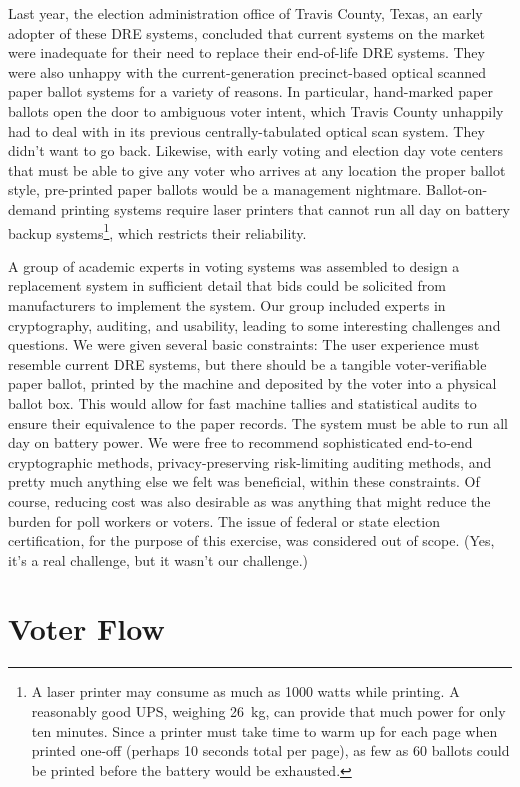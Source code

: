 \documentclass[letterpaper, 10pt, twocolumn]{article}
\begin{document}
Last year, the election administration office of Travis County, Texas, an
early adopter of these DRE systems, concluded that current
systems on the market were inadequate for their need to replace their
end-of-life DRE systems. They were also unhappy with the
current-generation precinct-based optical scanned paper ballot systems
for a variety of reasons. In particular, hand-marked paper ballots
open the door to ambiguous voter intent, which Travis County unhappily
had to deal with in its previous centrally-tabulated optical scan
system. They didn't want to go back. Likewise, with early
voting and election day vote centers that must be able to give
any voter who arrives at
any location the proper ballot style, pre-printed paper ballots would
be a management nightmare.
Ballot-on-demand printing systems
require laser printers that cannot run all day on battery backup
systems\footnote{A laser printer may consume as much as 1000 watts
  while printing. A reasonably good UPS, weighing 26~kg, can provide
  that much power for only ten minutes. Since a printer must take time
  to warm up for each page when printed one-off (perhaps 10
  seconds total per page), as few as 60 ballots could be printed before the
  battery would be exhausted.},
which restricts their reliability.

A group of academic experts in voting systems was assembled 
to design a replacement system in sufficient
detail that bids could be solicited from manufacturers to implement
the system. Our group included experts in cryptography, auditing, and
usability, leading to some interesting challenges and questions. We
were given several basic constraints: The user experience must
resemble current DRE systems, but there should be a tangible
voter-verifiable paper ballot, printed by the machine and deposited by
the voter into a physical ballot box. This would allow for fast machine
tallies and statistical audits to ensure their equivalence to the
paper records. The system must be able to run all day on battery power.
We were free to recommend sophisticated end-to-end
cryptographic methods, privacy-preserving risk-limiting auditing
methods, and pretty much anything else we felt was beneficial, within
these constraints. Of course, reducing cost was also desirable as was
anything that might reduce the burden for poll workers or voters. The
issue of federal or state election certification, for the purpose of
this exercise, was considered out of scope. (Yes, it's a real
challenge, but it wasn't our challenge.)

\section{Voter Flow}
\end{document}
